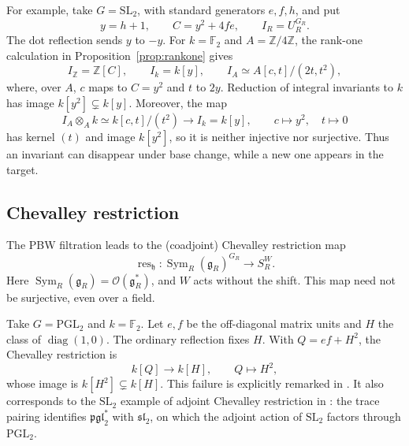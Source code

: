 \documentclass[twoside,a4paper,12pt,reqno]{amsart}
\theoremstyle{remark}
\numberwithin{equation}{section}
\newcommand{\Z}{\mathbb Z}
\newcommand{\F}{\mathbb F}
\newcommand{\cO}{\mathcal O}
\newcommand{\fg}{\mathfrak g}
\newcommand{\fh}{\mathfrak h}
\DeclareMathOperator{\Sym}{Sym}
\begin{document}
For example, take \(G=\mathrm{SL}_2\), with standard generators
\(e,f,h\), and put
\[
y=h+1,\qquad C=y^2+4fe,\qquad I_R=U_R^{G_R}.
\]
The dot reflection sends \(y\) to \(-y\).
For \(k=\F_2\) and \(A=\Z/4\Z\), the rank-one calculation in
Proposition~\ref{prop:rankone} gives
\begin{equation}\label{eq:intro-sl2-z4}
I_{\Z}=\Z[C],\qquad I_k=k[y],\qquad
I_A\simeq A[c,t]/(2t,t^2),
\end{equation}
where, over \(A\), \(c\) maps to \(C=y^2\) and \(t\) to \(2y\).
Reduction of integral invariants to \(k\) has image
\(k[y^2]\subsetneq k[y]\). Moreover, the map
\[
I_A\otimes_A k\simeq k[c,t]/(t^2)\longrightarrow I_k=k[y],
\qquad c\longmapsto y^2,\quad t\longmapsto0
\]
has kernel \((t)\) and image \(k[y^2]\), so it is neither injective nor
surjective. Thus an invariant can disappear under base change, while a
new one appears in the target.

\subsection{Chevalley restriction}\label{subsec:chevalley}

The PBW filtration leads to the (coadjoint) Chevalley restriction map
\begin{equation}\label{eq:intro-chevalley}
\operatorname{res}_{\fh}:
\Sym_R(\fg_R)^{G_R}\longrightarrow S_R^W.
\end{equation}
Here \(\Sym_R(\fg_R)=\cO(\fg_R^*)\), and \(W\) acts without the
shift. This map need not be surjective, even over a field.

Take \(G=\mathrm{PGL}_2\) and \(k=\F_2\). Let \(e,f\) be the
off-diagonal matrix units and \(H\) the class of
\(\operatorname{diag}(1,0)\). The ordinary reflection fixes \(H\).
With \(Q=ef+H^2\), the Chevalley restriction is
\begin{equation}\label{eq:intro-chevalley-counterexample}
k[Q]\longrightarrow k[H],\qquad Q\longmapsto H^2,
\end{equation}
whose image is \(k[H^2]\subsetneq k[H]\).
This failure is explicitly remarked in \cite[Rem.~3.11]{Spice}.
It also corresponds to the \(\mathrm{SL}_2\) example of adjoint Chevalley restriction in
\cite[Fact~6.1 and Prop.~6.2]{CR}: the trace pairing identifies
\(\mathfrak{pgl}_2^*\) with \(\mathfrak{sl}_2\), on which the adjoint
action of \(\mathrm{SL}_2\) factors through \(\mathrm{PGL}_2\).
\end{document}
